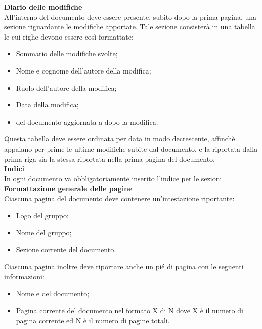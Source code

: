   \textbf{Diario delle modifiche} \\
  All'interno del documento deve essere presente, subito dopo la prima pagina, una sezione riguardante le modifiche apportate. Tale sezione consisterà in una tabella le cui righe devono essere cos\`i formattate:
  \begin{itemize}
  \item Sommario delle modifiche svolte;
  \item Nome e cognome dell'autore della modifica;
  \item Ruolo dell'autore della modifica;
  \item Data della modifica;
  \item {} del documento aggiornata a dopo la modifica.
  \end{itemize}
  Questa tabella deve essere ordinata per data in modo decrescente, affinch\`e appaiano per prime le ultime modifiche subite dal documento, e la  riportata dalla prima riga sia la stessa riportata nella prima pagina del documento. \\

  \textbf{Indici} \\
  In ogni documento va obbligatoriamente inserito l'indice per le sezioni. \\

  \textbf{Formattazione generale delle pagine}  \\
  Ciascuna pagina del documento deve contenere un'intestazione riportante:
  \begin{itemize}
  \item Logo del gruppo;
  \item Nome del gruppo;
  \item Sezione corrente del documento.
  \end{itemize}
  Ciascuna pagina inoltre deve riportare anche un pi\'e di pagina con le seguenti informazioni:
  \begin{itemize}
  \item Nome e  del documento;
  \item Pagina corrente del documento nel formato X di N dove X è il numero di pagina corrente ed N è il numero di pagine totali.
  \end{itemize}

